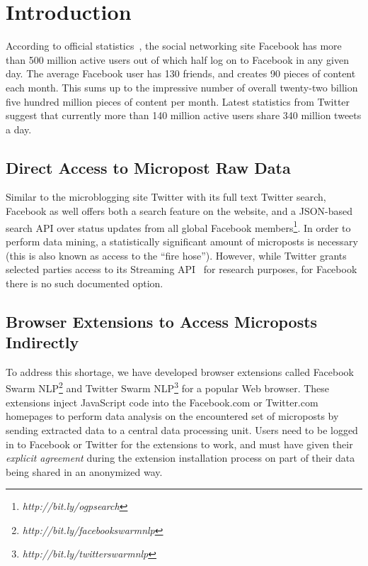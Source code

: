 \documentclass[twocolumn]{article}
\begin{document}
\section{Introduction}                                                      \label{sec:introduction}
According to official statistics~\cite{Facebook}, the social networking site Facebook has more than 500 million active users out of which half log on to Facebook in any given day. The average Facebook user has 130 friends, and creates 90 pieces of content each month. This sums up to the impressive number of overall twenty-two billion five hundred million pieces of content per month. 
Latest statistics from Twitter~\cite{TweetStats} suggest that currently more than 140 million active users share 340 million tweets a day. 

\subsection{Direct Access to Micropost Raw Data}
Similar to the microblogging site Twitter with its full text Twitter search, Facebook as well offers both a search feature on the website, and a JSON-based search API over status updates from all global Facebook members\footnote{\textit{http://bit.ly/ogpsearch}}. In order to perform data mining, a statistically significant amount of microposts is necessary (this is also known as access to the ``fire hose''). However, while Twitter grants selected parties access to its Streaming API~\cite{Twitter} for research purposes, for Facebook there is no such documented option.

\subsection{Browser Extensions to Access Microposts Indirectly}
To address this shortage, we have developed browser extensions called Facebook Swarm NLP\footnote{\textit{http://bit.ly/facebookswarmnlp}} and Twitter Swarm NLP\footnote{\textit{http://bit.ly/twitterswarmnlp}} for a popular Web browser. These extensions inject JavaScript code into the Facebook.com or Twitter.com homepages to perform data analysis on the encountered set of microposts by sending extracted data to a central data processing unit.
Users need to be logged in to Facebook or Twitter for the extensions to work, and must have given their \emph{explicit agreement} during the extension installation process on part of their data being shared in an anonymized way.
\end{document}
